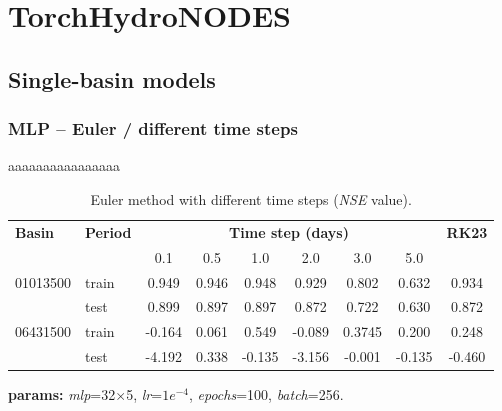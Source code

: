 \documentclass{article}
\begin{document}
\section{TorchHydroNODES}

\subsection{Single-basin models}

\subsubsection{MLP -- Euler / different time steps}

aaaaaaaaaaaaaaaa

\begin{table}[htbp]
    \centering
    \begin{threeparttable}

        \caption{Euler method with different time steps (\emph{NSE} value).}

        \begin{tabular}{llccccccc}
            \toprule
            \multirow{2}{*}{\textbf{Basin}} & \multirow{2}{*}{\textbf{\textbf{Period}}} & \multicolumn{6}{c}{\textbf{Time step (days)}} & \multirow{2}{*}{\textbf{RK23}} \\
            & & 0.1 & 0.5 & 1.0 & 2.0 & 3.0 & 5.0 \\
            \midrule
            \multirow{2}{*}{01013500} & train & 0.949 & 0.946 & 0.948 & 0.929 & 0.802 & 0.632 & 0.934 \\
                                      & test  & 0.899 & 0.897 & 0.897 & 0.872 & 0.722 & 0.630 & 0.872 \\
            \midrule
            \multirow{2}{*}{06431500} & train & -0.164 & 0.061 & 0.549 & -0.089 & 0.3745 & 0.200 & 0.248 \\
                                      & test  & -4.192 & 0.338 & -0.135 & -3.156 & -0.001 & -0.135 & -0.460 \\
            \bottomrule
        \end{tabular}

        \begin{tablenotes}
            \item \textbf{params:} \emph{mlp}=32$\times$5, \emph{lr}=$1e^{-4}$, \emph{epochs}=100, \emph{batch}=256.
        \end{tablenotes}

    \end{threeparttable}
\end{table}
\end{document}
